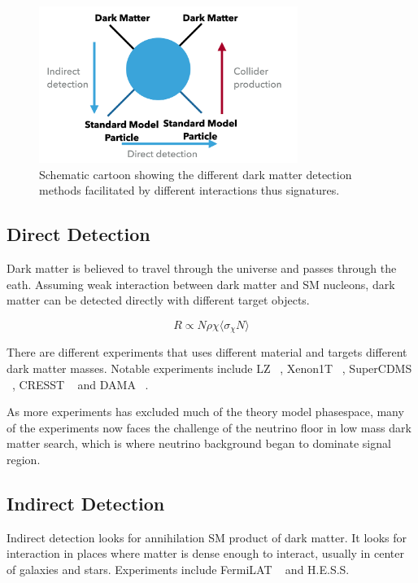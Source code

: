 \begin{figure}[!htb]
    \begin{center}
        \includegraphics[width=0.75\textwidth]{figures/chapter_DM/Interaction}
        \caption{
			Schematic cartoon showing the different dark matter detection methods facilitated by different interactions thus signatures. 
        }
        \label{fig:interaction}
    \end{center}
\end{figure}

\subsection{Direct Detection}
Dark matter is believed to travel through the universe and passes through the eath. Assuming weak interaction between dark matter and SM nucleons, dark matter can be detected directly with different target objects. 

\[ R \propto N \rho \chi \langle \sigma_{\chi } N \rangle \]

There are different experiments that uses different material and targets different dark matter masses.
Notable experiments include LZ ~\cite{mckinsey2016lz},   Xenon1T ~\cite{aprile2020excess}, SuperCDMS ~\cite{Agnese_2016}, CRESST ~\cite{Angloher_2014} and DAMA ~\cite{Bernabei_2008}. 

As more experiments has excluded much of the theory model phasespace, many of the experiments now faces the challenge of the neutrino floor in low mass dark matter search, which is where neutrino background began to dominate signal region. 



\subsection{Indirect Detection}
Indirect detection looks for annihilation SM product of dark matter. It looks for interaction in places where matter is dense enough to interact, usually in center of galaxies and stars. Experiments include FermiLAT ~\cite{albert2017searching} and H.E.S.S. ~\cite{aharonian2006hess}


